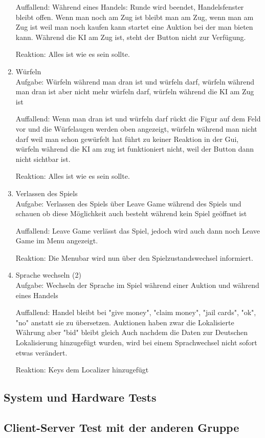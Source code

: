 \documentclass[a4paper,10pt]{article}
\begin{document}
\begin{enumerate}
Auffallend: Während eines Handels: Runde wird beendet, Handelsfenster bleibt offen. Wenn man noch am Zug ist bleibt man am Zug, wenn man am Zug ist weil man noch kaufen kann startet eine Auktion bei der man bieten kann. Während die KI am Zug ist, steht der Button nicht zur Verfügung.

Reaktion: Alles ist wie es sein sollte.
\item Würfeln\\
Aufgabe: Würfeln während man dran ist und würfeln darf, würfeln während man dran ist aber nicht mehr würfeln darf, würfeln während die KI am Zug ist

Auffallend: Wenn man dran ist und würfeln darf rückt die Figur auf dem Feld vor und die Würfelaugen werden oben angezeigt, würfeln während man nicht darf weil man schon gewürfelt hat führt zu keiner Reaktion in der Gui, würfeln während die KI am zug ist funktioniert nicht, weil der Button dann nicht sichtbar ist.

Reaktion: Alles ist wie es sein sollte.
\item Verlassen des Spiels\\
Aufgabe: Verlassen des Spiels über Leave Game während des Spiels und schauen ob diese Möglichkeit auch besteht während kein Spiel geöffnet ist

Auffallend: Leave Game verlässt das Spiel, jedoch wird auch dann noch Leave Game im Menu angezeigt.

Reaktion: Die Menubar wird nun über den Spielzustandswechsel informiert.
\item Sprache wechseln (2)\\
Aufgabe: Wechseln der Sprache im Spiel während einer Auktion und während eines Handels

Auffallend: Handel bleibt bei "give money", "claim money", "jail cards", "ok", "no" anstatt sie zu übersetzen. Auktionen haben zwar die Lokalisierte Währung aber "bid" bleibt gleich
Auch nachdem die Daten zur Deutschen Lokalisierung hinzugefügt wurden, wird bei einem Sprachwechsel nicht sofort etwas verändert.

Reaktion: Keys dem Localizer hinzugefügt
\end{enumerate}


\subsection{System und Hardware Tests}
\subsection{Client-Server Test mit der anderen Gruppe}
\end{document}
